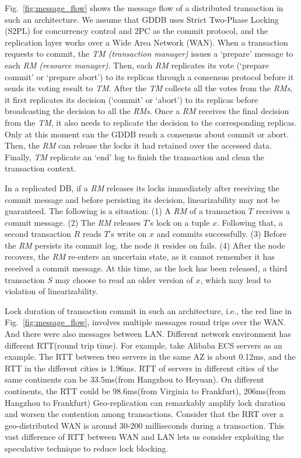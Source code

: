 \documentclass[conference]{IEEEtran}
\begin{document}
Fig.~\ref{fig:message_flow} shows the message flow of a distributed transaction in such an architecture. We assume that
GDDB uses Strict Two-Phase Locking (S2PL) for concurrency control and 2PC as the commit protocol, and the replication layer works over a Wide Area Network (WAN).
When a transaction requests to commit, the \emph{TM (transaction manager)} issues a `prepare' message to each \emph{RM (resource manager)}.
Then, each \emph{RM} replicates its vote (`prepare commit' or `prepare abort') to its replicas through a consensus protocol before it
sends its voting result to \emph{TM}.
After the \emph{TM} collects all the votes from the \emph{RMs}, it first replicates its decision (`commit' or `abort') to its replicas before broadcasting the decision to all the \emph{RMs}.
Once a \emph{RM} receives the final decision from the \emph{TM}, it also needs to replicate the decision to the corresponding replicas.
Only at this moment can the GDDB reach a consensus about commit or abort.
Then, the \emph{RM} can release the locks it had retained over the accessed data.
Finally, \emph{TM} replicate an `end' log to finish the transaction and clean the transaction context.
\begin{highlighted}


In a replicated DB, if a \emph{RM} releases its locks immediately after receiving the commit message and before persisting its decision, linearizability may not be guaranteed. 
The following is a situation:
(1) A \emph{RM} of a transaction ${T}$ receives a commit message.
(2) The \emph{RM} releases ${T}$'s lock on a tuple ${x}$. Following that,
a second transaction ${R}$ reads ${T}$'s write on ${x}$ and commits successfully.
(3) Before the \emph{RM} persists its commit log, the node it resides on fails. 
(4) After the node recovers, the \emph{RM} re-enters an uncertain state, as it cannot remember it has received a commit message. At this time, as the lock has been released, a third transaction ${S}$ may choose to read an older version of ${x}$, which may lead to violation of linearizability.


\end{highlighted}
\begin{highlighted}
Lock duration of transaction commit in such an architecture, i.e., the red line in Fig.~\ref{fig:message_flow}, involves multiple messages round trips over the WAN.
And there were also messages between LAN.
Different network environment has different RTT(round trip time).
For example, take Alibaba ECS servers as an example.
The RTT between two servers in the same AZ is about 0.12ms, and the RTT in the different cities is 1.96ms.
RTT of servers in different cities of the same continents can be 33.5ms(from Hangzhou to Heyuan).
On different continents, the RTT could be 98.6ms(from Virginia to Frankfurt), 206ms(from Hangzhou to Frankfurt)
Geo-replication can remarkably amplify lock duration and worsen the contention among transactions.
Consider that the RRT over a geo-distributed WAN is around 30-200 milliseconds during a transaction. 
This vast difference of RTT between WAN and LAN lets us consider exploiting the speculative technique to reduce lock blocking.
\end{highlighted}
\end{document}
